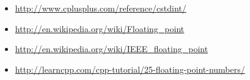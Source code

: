 
\begin{itemize}
\item \url{http://www.cplusplus.com/reference/cstdint/}
\item \url{http://en.wikipedia.org/wiki/Floating_point}
\item \url{http://en.wikipedia.org/wiki/IEEE_floating_point}
\item \url{http://learncpp.com/cpp-tutorial/25-floating-point-numbers/}
\end{itemize}	

